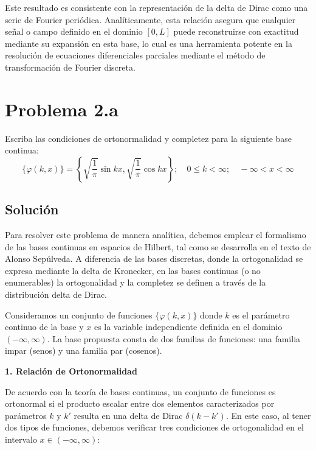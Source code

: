 \documentclass[a4paper]{article}
\begin{document}
Este resultado es consistente con la representación de la delta de Dirac como una serie de Fourier periódica. Analíticamente, esta relación asegura que cualquier señal o campo definido en el dominio $[0, L]$ puede reconstruirse con exactitud mediante su expansión en esta base, lo cual es una herramienta potente en la resolución de ecuaciones diferenciales parciales mediante el método de transformación de Fourier discreta.

\section{Problema 2.a}
Escriba las condiciones de ortonormalidad y completez para la siguiente base continua:
$$ \{ \varphi(k, x) \} = \left\{ \sqrt{\frac{1}{\pi}} \sin kx, \sqrt{\frac{1}{\pi}} \cos kx \right\} ; \quad 0 \leq k < \infty; \quad -\infty < x < \infty $$

\subsection{Solución}

Para resolver este problema de manera analítica, debemos emplear el formalismo de las bases continuas en espacios de Hilbert, tal como se desarrolla en el texto de Alonso Sepúlveda. A diferencia de las bases discretas, donde la ortogonalidad se expresa mediante la delta de Kronecker, en las bases continuas (o no enumerables) la ortogonalidad y la completez se definen a través de la distribución delta de Dirac.

Consideramos un conjunto de funciones $\{ \varphi(k, x) \}$ donde $k$ es el parámetro continuo de la base y $x$ es la variable independiente definida en el dominio $(-\infty, \infty)$. La base propuesta consta de dos familias de funciones: una familia impar (senos) y una familia par (cosenos).

\textbf{1. Relación de Ortonormalidad}

De acuerdo con la teoría de bases continuas, un conjunto de funciones es ortonormal si el producto escalar entre dos elementos caracterizados por parámetros $k$ y $k'$ resulta en una delta de Dirac $\delta(k - k')$. En este caso, al tener dos tipos de funciones, debemos verificar tres condiciones de ortogonalidad en el intervalo $x \in (-\infty, \infty)$:
\end{document}

